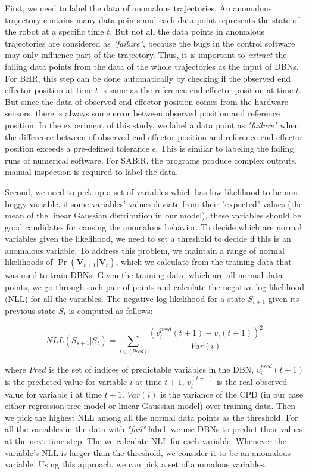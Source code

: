First, we need to label the data of anomalous trajectories. An anomalous trajectory contains many data points and each data point represents the state of the robot at a specific time $t$. But not all the data points in anomalous trajectories are considered as {\it "failure"}, because the bugs in the control software may only influence part of the trajectory. Thus, it is important to {\it extract} the failing data points from the data of the whole trajectories as the input of DBNs. For BHR, this step can be done automatically by checking if the observed end effector position at time $t$ is same as the reference end effector position at time $t$. But since the data of observed end effector position comes from the hardware sensors, there is always some error between observed position and reference position. In the experiment of this study, we label a data point as {\it "failure"} when the difference between of observed end effector position and reference end effector position exceeds a pre-defined tolerance $\epsilon$. This is similar to labeling the failing runs of numerical software. For SABiR, the programs produce complex outputs, manual inspection is required to label the data.

Second, we need to pick up a set of variables which has low likelihood to be non-buggy variable. if some variables' values deviate from their "expected" values (the mean of the linear Gaussian distribution in our model), these variables should be good candidates for causing the anomalous behavior.  To decide which are normal variables given the likelihood, we need to set a threshold to decide if this is an anomalous variable. To address this problem, we maintain a range of normal likelihoods of $\Pr ({\pmb{V}_{t + 1}}|{\pmb{V}_t})$, which we calculate from the training data that was used to train DBNs.  Given the training data, which are all normal data points, we go through each pair of points and calculate the negative log likelihood (NLL) for all the variables. The negative log likelihood for a state $S_{t+1}$ given its previous state ${S_t}$ is computed as follows:

\begin{equation}
NLL({S_{s + 1}}|{S_t}) = \sum\limits_{i \in \{ Pred\} } {\frac{{{{(v_i^{pred}(t + 1) - {v_i}(t + 1))}^2}}}{{Var(i)}}} 
\end{equation}

where $Pred$ is the set of indices of predictable variables in the DBN, $v_{i}^{pred}(t+1)$ is the predicted value for variable $i$ at time $t + 1$, $v_{i}^{(t + 1)}$ is the real observed value for variable i at time $t+ 1$. $Var(i)$ is the variance of the CPD (in our case either regression tree model or linear Gaussian model) over training data. Then we pick the highest NLL among all the normal data points as the threshold.  For all the variables in the data with {\it "fail"} label, we use DBNs to predict their values at the next time step. The we calculate NLL for each variable. Whenever the variable’s NLL is larger than the threshold, we consider it to be an anomalous variable. Using this approach, we can pick a set of anomalous variables.


